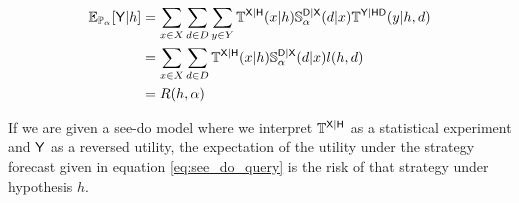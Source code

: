 \begin{align}
    \mathbb{E}_{\mathbb{P}_{\alpha}}[\mathsf{Y}|h] &= \sum_{x\in X} \sum_{d\in D} \sum_{y\in Y} \mathbb{T}^{\mathsf{X}|\mathsf{H}}(x|h) \mathbb{S}_\alpha^{\mathsf{D}|\mathsf{X}}(d|x) \mathbb{T}^{\mathsf{Y}|\mathsf{HD}}(y|h,d)\\
    &= \sum_{x\in X} \sum_{d\in D} \mathbb{T}^{\mathsf{X}|\mathsf{H}}(x|h) \mathbb{S}_\alpha ^{\mathsf{D}|\mathsf{X}}(d|x) l(h,d)\\
    &= R(h,\alpha)
\end{align}

If we are given a see-do model where we interpret $\mathbb{T}^{\mathsf{X}|\mathsf{H}}$ as a statistical experiment and $\mathsf{Y}$ as a reversed utility, the expectation of the utility under the strategy forecast given in equation \ref{eq:see_do_query} is the risk of that strategy under hypothesis $h$.
